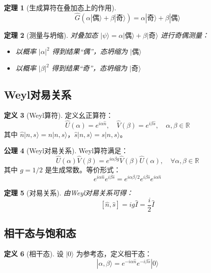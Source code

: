 \documentclass[12pt]{article}
\newtheorem{theorem}{定理}[section]
\theoremstyle{definition}
\newtheorem{definition}[theorem]{定义}
\newtheorem{axiom}[theorem]{公理}
\newcommand{\R}{\mathbb{R}}
\begin{document}
\begin{theorem}[生成算符在叠加态上的作用]
\[
\hat{G}(\alpha|\text{偶}\rangle + \beta|\text{奇}\rangle) = \alpha|\text{奇}\rangle + \beta|\text{偶}\rangle
\]
\end{theorem}

\begin{theorem}[测量与坍缩]
对叠加态 \(|\psi\rangle = \alpha|\text{偶}\rangle + \beta|\text{奇}\rangle\) 进行奇偶测量：
\begin{itemize}
    \item 以概率 \(|\alpha|^2\) 得到结果“偶”，态坍缩为 \(|\text{偶}\rangle\)
    \item 以概率 \(|\beta|^2\) 得到结果“奇”，态坍缩为 \(|\text{奇}\rangle\)
\end{itemize}
\end{theorem}

\subsection{Weyl对易关系}

\begin{definition}[Weyl算符]
定义幺正算符：
\[
\hat{U}(\alpha) = e^{i\alpha\hat{n}},\quad \hat{V}(\beta) = e^{i\beta\hat{s}},\quad \alpha,\beta \in \R
\]
其中 \(\hat{n}|n,s\rangle = n|n,s\rangle\)，\(\hat{s}|n,s\rangle = s|n,s\rangle\)。
\end{definition}

\begin{axiom}[Weyl对易关系]
Weyl算符满足：
\[
\hat{U}(\alpha)\hat{V}(\beta) = e^{i\alpha\beta g} \hat{V}(\beta)\hat{U}(\alpha),\quad \forall \alpha,\beta \in \R
\]
其中 \(g = 1/2\) 是生成常数。等价形式：
\[
\boxed{e^{i\alpha\hat{n}} e^{i\beta\hat{s}} = e^{i\alpha\beta/2} e^{i\beta\hat{s}} e^{i\alpha\hat{n}}}
\]
\end{axiom}

\begin{theorem}[对易关系]
由Weyl对易关系可得：
\[
[\hat{n}, \hat{s}] = ig\hat{I} = \frac{i}{2}\hat{I}
\]
\end{theorem}

\subsection{相干态与饱和态}

\begin{definition}[相干态]
设 \(|0\rangle\) 为参考态，定义相干态：
\[
|\alpha,\beta\rangle = e^{-i\alpha\hat{n}} e^{-i\beta\hat{s}} |0\rangle
\]
\end{definition}
\end{document}
